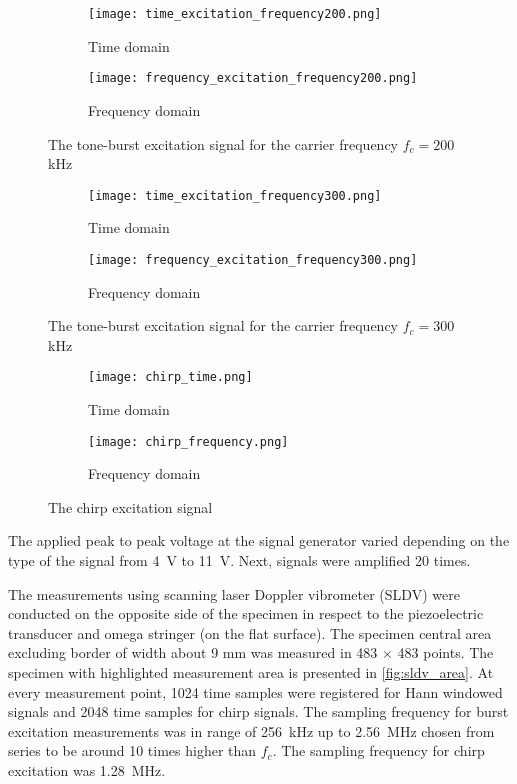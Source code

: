 \documentclass[times,final]{elsarticle}
\begin{document}
\begin{figure} [h!]
	\centering
		\begin{subfigure}[b]{0.49\textwidth}
		\texttt{[image: time\_excitation\_frequency200.png]}
		\caption{Time domain}
		\label{fig:time_exc200}
	\end{subfigure}
	\begin{subfigure}[b]{0.49\textwidth}
		\texttt{[image: frequency\_excitation\_frequency200.png]}
		\caption{Frequency domain}
		\label{fig:freq_exc200}
	\end{subfigure}
	\caption{The tone-burst excitation signal for the carrier frequency $f_c=200$ kHz}
	\label{fig:exc200}
\end{figure}
\begin{figure} [h!]
	\centering
		\begin{subfigure}[b]{0.49\textwidth}
		\texttt{[image: time\_excitation\_frequency300.png]}
		\caption{Time domain}
		\label{fig:time_exc300}
	\end{subfigure}
	\begin{subfigure}[b]{0.49\textwidth}
		\texttt{[image: frequency\_excitation\_frequency300.png]}
		\caption{Frequency domain}
		\label{fig:freq_exc300}
	\end{subfigure}
	\caption{The tone-burst excitation signal for the carrier frequency $f_c=300$ kHz}
	\label{fig:exc300}
\end{figure}
\begin{figure} [h!]
	\centering
		\begin{subfigure}[b]{0.49\textwidth}
		\texttt{[image: chirp\_time.png]}
		\caption{Time domain}
		\label{fig:time_chirp}
	\end{subfigure}
	\begin{subfigure}[b]{0.49\textwidth}
		\texttt{[image: chirp\_frequency.png]}
		\caption{Frequency domain}
		\label{fig:freq_chirp}
	\end{subfigure}
	\caption{The chirp excitation signal}
	\label{fig:chirp}
\end{figure}

The applied peak to peak voltage at the signal generator varied depending on the type of the signal from \SI{4}{\volt} to \SI{11}{\volt}. 
Next, signals were amplified \num{20} times.

The measurements using scanning laser Doppler vibrometer (SLDV) were conducted on the opposite side of the specimen in respect to the piezoelectric transducer and omega stringer (on the flat surface).
The specimen central area excluding border of width about 9 mm was measured in \num{483} $\times$ \num{483} points. 
The specimen with highlighted measurement area is presented in \autoref{fig:sldv_area}.
At every measurement point, \num{1024} time samples were registered for Hann windowed signals and \num{2048} time samples for chirp signals. The sampling frequency for burst excitation measurements was in range of \SI{256}{\kilo\hertz} up to \SI{2.56}{\mega\hertz} chosen from series to be around \num{10} times higher than \(f_c\). The sampling frequency for chirp excitation was \SI{1.28}{\mega\hertz}.
\end{document}
